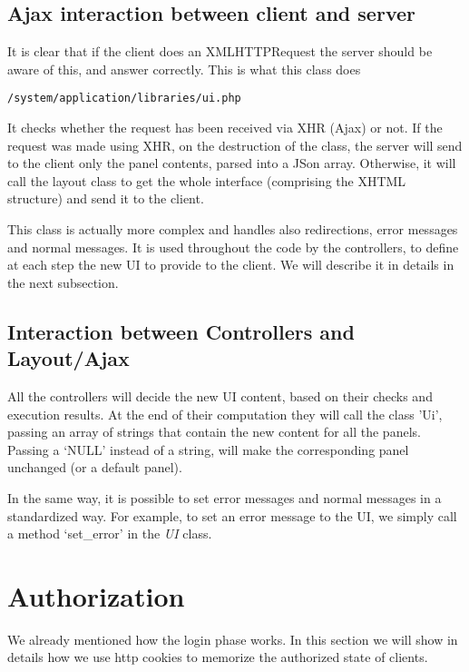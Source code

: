 \subsection{Ajax interaction between client and server}
It is clear that if the client does an XMLHTTPRequest the server should be aware of this, and answer correctly. This is what this class does
\begin{verbatim}/system/application/libraries/ui.php
\end{verbatim}
It checks whether the request has been received via XHR (Ajax) or not. If the request was made using XHR, on the destruction of the class, the server will send to the client only the panel contents, parsed into a JSon array. Otherwise, it will call the layout class to get the whole interface (comprising the XHTML structure) and send it to the client.

This class is actually more complex and handles also redirections, error messages and normal messages. It is used throughout the code by the controllers, to define at each step the new UI to provide to the client. We will describe it in details in the next subsection.

\subsection{Interaction between Controllers and Layout/Ajax}
All the controllers will decide the new UI content, based on their checks and execution results. At the end of their computation they will call the class 'Ui', passing an array of strings that contain the new content for all the panels. Passing a `NULL' instead of a string, will make the corresponding panel unchanged (or a default panel).

In the same way, it is possible to set error messages and normal messages in a standardized way. For example, to set an error message to the UI, we simply call a method `set\_error' in the \emph{UI} class.


\section{Authorization}
We already mentioned how the login phase works. In this section we will show in details how we use http cookies to memorize the authorized state of clients.
